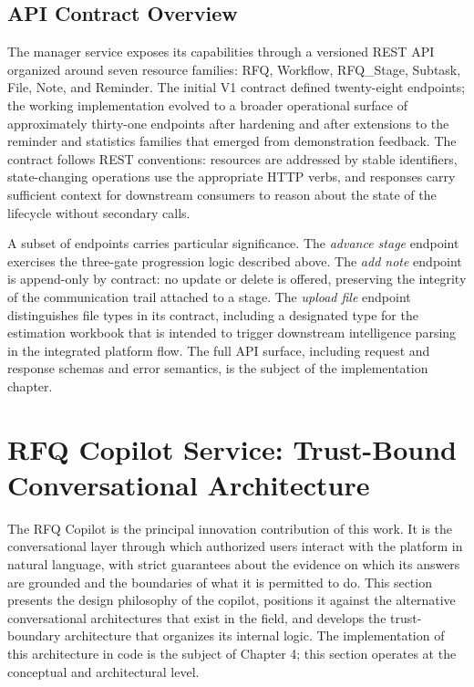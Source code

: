 \subsection*{API Contract Overview}
The manager service exposes its capabilities through a versioned REST API organized around seven resource families: RFQ, Workflow, RFQ\_Stage, Subtask, File, Note, and Reminder. The initial V1 contract defined twenty-eight endpoints; the working implementation evolved to a broader operational surface of approximately thirty-one endpoints after hardening and after extensions to the reminder and statistics families that emerged from demonstration feedback. The contract follows REST conventions: resources are addressed by stable identifiers, state-changing operations use the appropriate HTTP verbs, and responses carry sufficient context for downstream consumers to reason about the state of the lifecycle without secondary calls.

A subset of endpoints carries particular significance. The \textit{advance stage} endpoint exercises the three-gate progression logic described above. The \textit{add note} endpoint is append-only by contract: no update or delete is offered, preserving the integrity of the communication trail attached to a stage. The \textit{upload file} endpoint distinguishes file types in its contract, including a designated type for the estimation workbook that is intended to trigger downstream intelligence parsing in the integrated platform flow. The full API surface, including request and response schemas and error semantics, is the subject of the implementation chapter.

\section{RFQ Copilot Service: Trust-Bound Conversational Architecture}
The RFQ Copilot is the principal innovation contribution of this work. It is the conversational layer through which authorized users interact with the platform in natural language, with strict guarantees about the evidence on which its answers are grounded and the boundaries of what it is permitted to do. This section presents the design philosophy of the copilot, positions it against the alternative conversational architectures that exist in the field, and develops the trust-boundary architecture that organizes its internal logic. The implementation of this architecture in code is the subject of Chapter 4; this section operates at the conceptual and architectural level.

